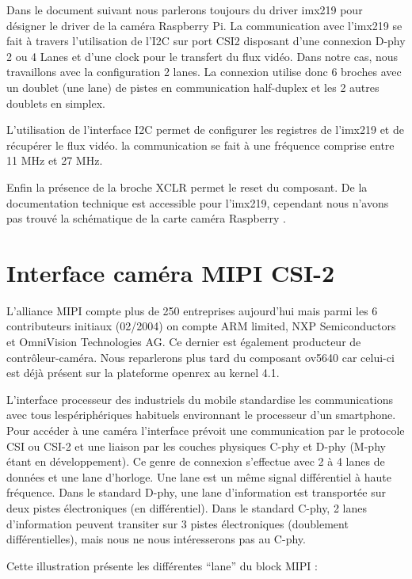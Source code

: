 Dans le document suivant nous parlerons toujours du driver imx219 pour désigner le driver
de la caméra Raspberry Pi. La communication avec l’imx219 se fait à travers l’utilisation
de l’I2C sur port CSI2 disposant d’une connexion D-phy 2 ou 4 Lanes et d’une clock pour
le transfert du flux vidéo. Dans notre cas, nous travaillons avec la configuration 2 lanes. La
connexion utilise donc 6 broches avec un doublet (une lane) de pistes en communication
half-duplex et les 2 autres doublets en simplex.\medskip

L’utilisation de l’interface I2C permet de configurer les registres de l’imx219 et de
récupérer le flux vidéo. la communication se fait à une fréquence comprise entre 11 MHz
et 27 MHz.\medskip

Enfin la présence de la broche XCLR permet le reset du composant.
De la documentation technique est accessible pour l’imx219, cependant nous n’avons pas
trouvé la schématique de la carte caméra Raspberry .

\section{Interface caméra MIPI CSI-2}

L’alliance MIPI compte plus de 250 entreprises aujourd’hui mais parmi les 6 contributeurs
initiaux (02/2004) on compte ARM limited, NXP Semiconductors et OmniVision
Technologies AG. Ce dernier est également producteur de contrôleur-caméra. Nous
reparlerons plus tard du composant ov5640 car celui-ci est déjà présent sur la plateforme
openrex au kernel 4.1. \medskip

L’interface processeur des industriels du mobile
standardise les communications avec tous lespériphériques habituels environnant le processeur d’un smartphone. Pour accéder à une
caméra l’interface prévoit une communication par le protocole CSI ou CSI-2 et une liaison
par les couches physiques C-phy et D-phy (M-phy étant en développement). Ce genre de
connexion s’effectue avec 2 à 4 lanes de données et une lane d’horloge. Une lane est un
même signal différentiel à haute fréquence. Dans le standard D-phy, une lane
d’information est transportée sur deux pistes électroniques (en différentiel). Dans le
standard C-phy, 2 lanes d’information peuvent transiter sur 3 pistes électroniques
(doublement différentielles), mais nous ne nous intéresserons pas au C-phy. \medskip

Cette illustration présente les différentes “lane” du block MIPI :

